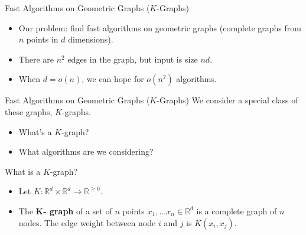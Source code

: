 \begin{frame}{Fast Algorithms on Geometric Graphs ($K$-Graphs)}

\begin{itemize}
  \item <+-> Our problem: find fast algorithms on geometric graphs
    (complete graphs from $n$ points in $d$ dimensions).
  \item <+-> There are {\color{red}$n^2$} edges in the graph, but input
    is size {\color{darkgreen}$nd$}.
  \item <+-> When $d = o(n)$, we can hope for $o(n^2)$ algorithms.
\end{itemize}
\end{frame}
\begin{frame}{Fast Algorithms on Geometric Graphs ($K$-Graphs)}
  We consider a special class of these graphs, $K$-graphs.
  \begin{itemize}
  \item <+-> What's a $K$-graph?
  \item <+-> What algorithms are we considering?
\end{itemize}
\end{frame}
\begin{frame}{What is a $K$-graph?}
  \begin{itemize}
  \item <+-> Let $K:\mathbb{R}^d \times \mathbb{R}^d \rightarrow
    \mathbb{R}^{\geq 0}$.
  \item <+-> The \textbf{K- graph} of a set of $n$ points $x_1, \ldots
    x_n \in \mathbb{R}^d$ is a complete graph of $n$ nodes. The edge
    weight between node $i$ and $j$ is $K(x_i, x_j)$.
\end{itemize}
\end{frame}
% 
% 


